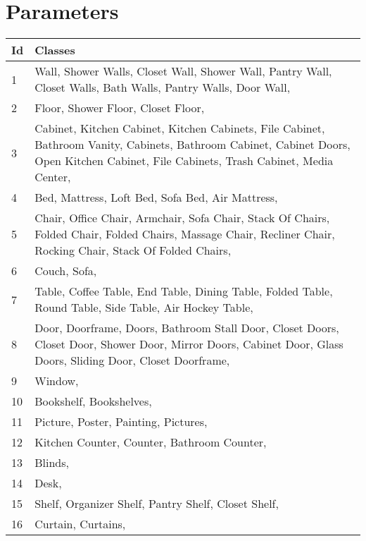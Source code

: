     \chapter{Parameters}
        \begin{table}[h]
    	\begin{center}
    		\begin{tabular}{ | l | p{17cm} |}
    			\hline
    			
    			\cellcolor{purple!30}Id & \cellcolor{purple!30}Classes \\ \hline
    			
    			1 & Wall, Shower Walls, Closet Wall, Shower Wall, Pantry Wall, Closet Walls, Bath Walls, Pantry Walls, Door Wall, \\ \hline
    			2 & Floor, Shower Floor, Closet Floor, \\ \hline
    			3 & Cabinet, Kitchen Cabinet, Kitchen Cabinets, File Cabinet, Bathroom Vanity, Cabinets, Bathroom Cabinet, Cabinet Doors, Open Kitchen Cabinet, File Cabinets, Trash Cabinet, Media Center, \\ \hline
    			4 & Bed, Mattress, Loft Bed, Sofa Bed, Air Mattress, \\ \hline
    			5 & Chair, Office Chair, Armchair, Sofa Chair, Stack Of Chairs, Folded Chair, Folded Chairs, Massage Chair, Recliner Chair, Rocking Chair, Stack Of Folded Chairs, \\ \hline
    			6 & Couch, Sofa, \\ \hline
    			7 & Table, Coffee Table, End Table, Dining Table, Folded Table, Round Table, Side Table, Air Hockey Table, \\ \hline
    			8 & Door, Doorframe, Doors, Bathroom Stall Door, Closet Doors, Closet Door, Shower Door, Mirror Doors, Cabinet Door, Glass Doors, Sliding Door, Closet Doorframe, \\ \hline
    			9 & Window, \\ \hline
    			10 & Bookshelf, Bookshelves, \\ \hline
    			11 & Picture, Poster, Painting, Pictures, \\ \hline
    			12 & Kitchen Counter, Counter, Bathroom Counter, \\ \hline
    			13 & Blinds, \\ \hline
    			14 & Desk, \\ \hline
    			15 & Shelf, Organizer Shelf, Pantry Shelf, Closet Shelf, \\ \hline
    			16 & Curtain, Curtains, \\ \hline

\end{tabular}
\end{center}
\end{table}
